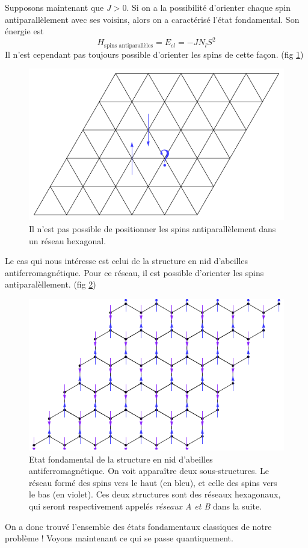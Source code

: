 \documentclass[a4paper, french]{report}
\newcommand{\1}{\ensuremath{\ket{\om_1\bom_1}}\xspace}
\newcommand{\2}{\ensuremath{\ket{\om_2\bom_2}}\xspace}
\newcommand{\struc}{structure en nid d'abeilles }
\begin{document}
Supposons maintenant que $J>0$. Si on a la possibilité d'orienter chaque spin antiparallèlement avec ses voisins, alors on a caractérisé l'état fondamental. Son énergie est 
\begin{equation}
\label{eq:class}
	H_{\text{spins antiparallèles}}=E_{cl}=-JN_lS^2
\end{equation}
Il n'est cependant pas toujours possible d'orienter les spins de cette façon. (fig \ref{2})

\begin{figure}[htp]
\centering
\includegraphics[scale=1.00]{vector_img/nobip.pdf}
\caption{Il n'est pas possible de positionner les spins antiparallèlement dans un réseau hexagonal.}
\label{2}
\end{figure}

Le cas qui nous intéresse est celui de la \struc antiferromagnétique. Pour ce réseau, il est possible d'orienter les spins antiparalèllement. (fig \ref{3})

\begin{figure}[htp]
\centering
\includegraphics[scale=1.00]{vector_img/spins_struc_nid_abeilles.pdf}
\caption{Etat fondamental de la \struc antiferromagnétique. On voit apparaître deux sous-structures. Le réseau formé des spins vers le \og haut \fg{} (en bleu), et celle des spins vers le \og bas \fg{} (en violet). Ces deux structures sont des réseaux hexagonaux, qui seront respectivement appelés \emph{réseaux A et B} dans la suite.}
\label{3}
\end{figure}
On a donc trouvé l'ensemble des états fondamentaux classiques de notre problème ! Voyons maintenant ce qui se passe quantiquement.
\end{document}
